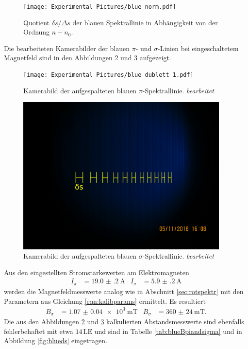 \begin{figure}[H]
  \centering
  \texttt{[image: Experimental Pictures/blue\_norm.pdf]}
  \caption{Quotient $\delta s/\Delta s$ der blauen Spektrallinie in Abhängigkeit von der Ordnung $n-n_0$.}
  \label{fig:blueB0}
\end{figure}

Die bearbeiteten Kamerabilder der blauen $\pi$- und $\sigma$-Linien bei eingeschaltetem
Magnetfeld sind in den Abbildungen \ref{fig:bluepi} und \ref{fig:bluesigma} aufgezeigt.

\begin{figure}[H]
  \centering
  \texttt{[image: Experimental Pictures/blue\_dublett\_1.pdf]}
  \caption{Kamerabild der aufgespalteten blauen $\pi$-Spektrallinie. \textit{bearbeitet}}
  \label{fig:bluepi}
\end{figure}

\begin{figure}[H]
  \centering
  \includegraphics[height=8cm]{Experimental Pictures/blue_dublett_2.pdf}
  \caption{Kamerabild der aufgespalteten blauen $\sigma$-Spektrallinie. \textit{bearbeitet}}
  \label{fig:bluesigma}
\end{figure}

Aus den eingestellten Stromstärkewerten am Elektromagneten
\begin{align}
  I_\pi &= \SI{19.0(2)}{\ampere} & I_\sigma &= \SI{5.9(2)}{\ampere}
\end{align}
werden die Magnetfeldmesswerte analog wie in Abschnitt \ref{sec:rotspektr} mit
den Parametern aus Gleichung \ref{eqn:kalibparams} ermittelt. Es resultiert
\begin{align}
  B_\pi &= \SI{1.07(4)e3}{\milli\tesla} & B_\sigma &= \SI{360(24)}{\milli\tesla}.
  \label{eqn:Bblau}
\end{align}
Die aus den Abbildungen \ref{fig:bluepi} und \ref{fig:bluesigma} kalkulierten Abstandsmesswerte
sind ebenfalls fehlerbehaftet mit etwa $14 \, \text{LE}$ und sind in Tabelle
\ref{tab:blueBpiandsigma} und in Abbildung \ref{fig:blueds} eingetragen.

